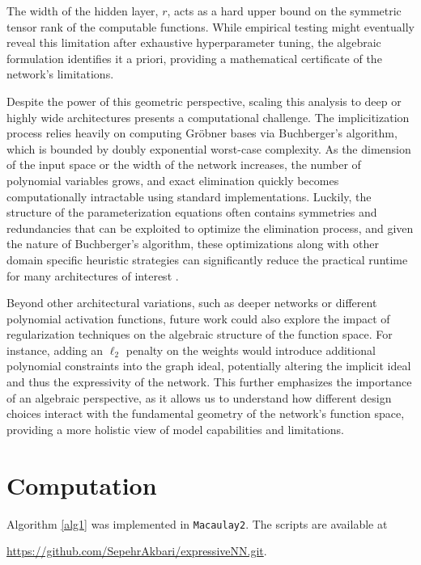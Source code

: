 \documentclass[12pt]{amsproc}
\renewcommand{\-}{\setminus}
\newcommand\<{\langle}
\renewcommand\>{\rangle}
\theoremstyle{plain}
\theoremstyle{definition}
\theoremstyle{remark}
\begin{document}
The width of the hidden layer, $r$, acts as a hard upper bound on the symmetric tensor rank of the computable functions. While empirical testing might eventually reveal this limitation after exhaustive hyperparameter tuning, the algebraic formulation identifies it a priori, providing a mathematical certificate of the network's limitations.

Despite the power of this geometric perspective, scaling this analysis to deep or highly wide architectures presents a computational challenge. The implicitization process relies heavily on computing Gröbner bases via Buchberger's algorithm, which is bounded by doubly exponential worst-case complexity. As the dimension of the input space or the width of the network increases, the number of polynomial variables grows, and exact elimination quickly becomes computationally intractable using standard implementations. Luckily, the structure of the parameterization equations often contains symmetries and redundancies that can be exploited to optimize the elimination process, and given the nature of Buchberger's algorithm, these optimizations along with other domain specific heuristic strategies can significantly reduce the practical runtime for many architectures of interest \cite{cox2015IVA}.

Beyond other architectural variations, such as deeper networks or different polynomial activation functions, future work could also explore the impact of regularization techniques on the algebraic structure of the function space. For instance, adding an $\ell_2$ penalty on the weights would introduce additional polynomial constraints into the graph ideal, potentially altering the implicit ideal and thus the expressivity of the network. This further emphasizes the importance of an algebraic perspective, as it allows us to understand how different design choices interact with the fundamental geometry of the network's function space, providing a more holistic view of model capabilities and limitations.




\appendix
\section{Computation}

Algorithm \ref{alg1} was implemented in \texttt{Macaulay2}. The scripts are available at 

\qquad \url{https://github.com/SepehrAkbari/expressiveNN.git}.

\vspace{2em}
\end{document}

